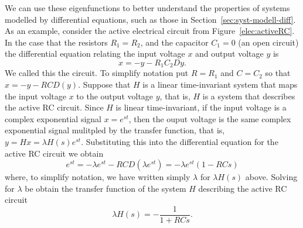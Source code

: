 We can use these eigenfunctions to better understand the properties of systems modelled by differential equations, such as those in Section~\ref{sec:syst-modell-diff}.  As an example, consider the active electrical circuit from Figure~\ref{elec:activeRC}.  In the case that the resistors $R_1 = R_2$, and the capacitor $C_1 = 0$ (an open circuit) the differential equation relating the input voltage $x$ and output voltage $y$ is
\[
x = - y - R_1 C_2 Dy.
\]
We called this the  circuit.  To simplify notation put $R = R_1$ and $C = C_2$ so that $x = -y - RCD(y)$.   
Suppose that $H$ is a linear time-invariant system that maps the input voltage $x$ to the output voltage $y$, that is, $H$ is a system that describes the active RC circuit.  Since $H$ is linear time-invariant, if the input voltage is a complex exponential signal $x = e^{st}$, then the ouput voltage is the same complex exponential signal mulitpled by the transfer function, that is, $y = Hx = \lambda H(s) e^{st}$.  Substituting this into the differential equation for the active RC circuit we obtain
\[
e^{st} = - \lambda e^{st}- R C D (\lambda e^{st}) = -\lambda e^{st} (1  - R C s)
\]
where, to simplify notation, we have written simply $\lambda$ for $\lambda H(s)$ above.  Solving for $\lambda$ be obtain the transfer function of the system $H$ describing the active RC circuit
\begin{equation}\label{eq:transferRCH}
\lambda H(s) = -\frac{1}{1 + R C s}.
\end{equation}

